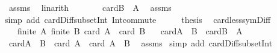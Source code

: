 \begin{isabellebody}
\ assms{\isacharparenleft}{\kern0pt}{}{\isacharparenright}{\kern0pt}\ \isamarkupfalse%
\ linarith\isanewline
\ \ \isamarkupfalse%
\ \isamarkupfalse%
\ {\isachardoublequoteopen}{\isasymdots}\ {\isacharequal}{\kern0pt}\ card{\isacharparenleft}{\kern0pt}B\ {\isacharminus}{\kern0pt}\ A{\isacharparenright}{\kern0pt}{\isachardoublequoteclose}\ \isamarkupfalse%
\ assms{\isacharparenleft}{\kern0pt}{}{\isacharcomma}{\kern0pt}{}{\isacharparenright}{\kern0pt}\ \isamarkupfalse%
{\isacharparenleft}{\kern0pt}simp\ add{\isacharcolon}{\kern0pt}\ card{\isacharunderscore}{\kern0pt}Diff{\isacharunderscore}{\kern0pt}subset{\isacharunderscore}{\kern0pt}Int\ Int{\isacharunderscore}{\kern0pt}commute{\isacharparenright}{\kern0pt}\isanewline
\ \ \isamarkupfalse%
\ \isamarkupfalse%
\ {\isacharquery}{\kern0pt}thesis\ \isacommand{{\isachardot}{\kern0pt}}\isamarkupfalse%
\isanewline
{}\isamarkupfalse%
%
\endisatagproof
{\isafoldproof}%
%
\isadelimproof
\isanewline
%
\endisadelimproof
\isanewline
{}\isamarkupfalse%
\ card{\isacharunderscore}{\kern0pt}less{\isacharunderscore}{\kern0pt}sym{\isacharunderscore}{\kern0pt}Diff{\isacharcolon}{\kern0pt}\isanewline
\ \ \ {\isachardoublequoteopen}finite\ A{\isachardoublequoteclose}\ {\isachardoublequoteopen}finite\ B{\isachardoublequoteclose}\ {\isachardoublequoteopen}card\ A\ {\isacharless}{\kern0pt}\ card\ B{\isachardoublequoteclose}\isanewline
\ \ \ {\isachardoublequoteopen}card{\isacharparenleft}{\kern0pt}A\ {\isacharminus}{\kern0pt}\ B{\isacharparenright}{\kern0pt}\ {\isacharless}{\kern0pt}\ card{\isacharparenleft}{\kern0pt}B\ {\isacharminus}{\kern0pt}\ A{\isacharparenright}{\kern0pt}{\isachardoublequoteclose}\isanewline
%
\isadelimproof
%
\endisadelimproof
%
\isatagproof
{}\isamarkupfalse%
\ {\isacharminus}{\kern0pt}\isanewline
\ \ \isamarkupfalse%
\ {\isachardoublequoteopen}card{\isacharparenleft}{\kern0pt}A\ {\isacharminus}{\kern0pt}\ B{\isacharparenright}{\kern0pt}\ {\isacharequal}{\kern0pt}\ card\ A\ {\isacharminus}{\kern0pt}\ card\ {\isacharparenleft}{\kern0pt}A\ {\isasyminter}\ B{\isacharparenright}{\kern0pt}{\isachardoublequoteclose}\ \isamarkupfalse%
\ assms{\isacharparenleft}{\kern0pt}{}{\isacharcomma}{\kern0pt}{}{\isacharparenright}{\kern0pt}\ \isamarkupfalse%
{\isacharparenleft}{\kern0pt}simp\ add{\isacharcolon}{\kern0pt}\ card{\isacharunderscore}{\kern0pt}Diff{\isacharunderscore}{\kern0pt}subset{\isacharunderscore}{\kern0pt}Int{\isacharparenright}{\kern0pt}\isanewline

\end{isabellebody}
